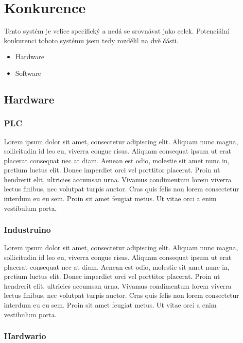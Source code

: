 \chapter{Konkurence}
Tento systém je velice specifický a nedá se srovnávat jako celek. 
Potenciální konkurenci tohoto systému jsem tedy rozdělil na dvě části.

\begin{itemize} %
    \item Hardware
    \item Software
\end{itemize}



\section{Hardware}



\subsection{PLC}
Lorem ipsum dolor sit amet, consectetur adipiscing elit.
Aliquam nunc magna, sollicitudin id leo eu, viverra congue risus.
Aliquam consequat ipsum ut erat placerat consequat nec at diam. 
Aenean est odio, molestie sit amet nunc in, pretium luctus elit. 
Donec imperdiet orci vel porttitor placerat. 
Proin ut hendrerit elit, ultricies accumsan urna. 
Vivamus condimentum lorem viverra lectus finibus, nec volutpat turpis auctor.
Cras quis felis non lorem consectetur interdum eu eu sem. 
Proin sit amet feugiat metus. 
Ut vitae orci a enim vestibulum porta. 


\subsection{Industruino}
Lorem ipsum dolor sit amet, consectetur adipiscing elit.
Aliquam nunc magna, sollicitudin id leo eu, viverra congue risus.
Aliquam consequat ipsum ut erat placerat consequat nec at diam. 
Aenean est odio, molestie sit amet nunc in, pretium luctus elit. 
Donec imperdiet orci vel porttitor placerat. 
Proin ut hendrerit elit, ultricies accumsan urna. 
Vivamus condimentum lorem viverra lectus finibus, nec volutpat turpis auctor.
Cras quis felis non lorem consectetur interdum eu eu sem. 
Proin sit amet feugiat metus. 
Ut vitae orci a enim vestibulum porta. 


\subsection{Hardwario}


